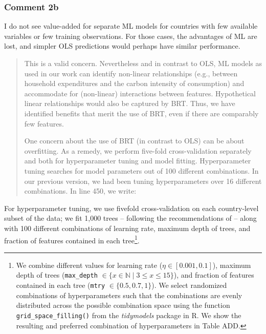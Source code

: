 \documentclass[11pt]{article}
\newenvironment{response}
{\begin{quote}\color{black}}
{\end{quote}}
\begin{document}
\subsubsection*{Comment 2b}\label{comment_R2_2b}

\begin{commentbox}
    I do not see value-added for separate ML models for countries with few available variables or few training observations. For those cases, the advantages of ML are lost, and simpler OLS predictions would perhaps have similar performance.
\end{commentbox}

\begin{response}
    This is a valid concern. Nevertheless and in contrast to OLS, ML models as used in our work can identify non-linear relationships (e.g., between household expenditures and the carbon intensity of consumption) and accommodate for (non-linear) interactions between features. Hypothetical linear relationships would also be captured by BRT. Thus, we have identified benefits that merit the use of BRT, even if there are comparably few features.

    One concern about the use of BRT (in contrast to OLS) can be about overfitting. As a remedy, we perform five-fold cross-validation separately and both for hyperparameter tuning and model fitting. Hyperparameter tuning searches for model parameters out of 100 different combinations. In our previous version, we had been tuning hyperparameters over 16 different combinations. In line 450, we write:
\end{response}

\begin{revisionbox}
    For hyperparameter tuning, we use fivefold cross-validation on each country-level subset of the data; we fit 1,000 trees -- following the recommendations of \textcite{Elith.2008} -- along with 100 different combinations of learning rate, maximum depth of trees, and fraction of features contained in each tree\footnote{We combine different values for learning rate ($\eta \in [0.001,0.1]$), maximum depth of trees (\texttt{max\_depth} $\in \{x \in \mathbb{N} \mid 3  \leq x \leq 15 \}$), and fraction of features contained in each tree (\texttt{mtry} $\in \{0.5,0.7,1\}$). We select randomized combinations of hyperparameters such that the combinations are evenly distributed across the possible combination space using the function \texttt{grid\_space\_filling()} from the \textit{tidymodels} package in R. We show the resulting and preferred combination of hyperparameters in Table ADD.}.
\end{revisionbox}
\end{document}
